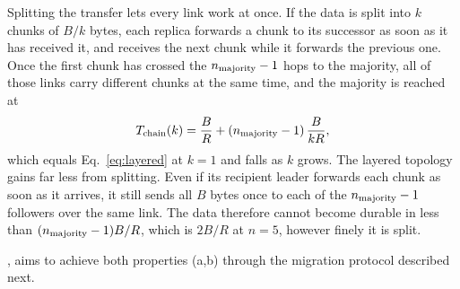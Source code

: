 Splitting the transfer lets every link work at once.
If the data is split into $k$ chunks of $B/k$ bytes, each replica forwards a chunk to its
successor as soon as it has received it, and receives the next chunk while it forwards the
previous one.
Once the first chunk has crossed the $n_{\mathrm{majority}} - 1$ hops to the majority, all of those links carry
different chunks at the same time, and the majority is reached at
\begin{equation}
  T_{\mathrm{chain}}(k) = \frac{B}{R} + (n_{\mathrm{majority}} - 1)\,\frac{B}{kR},
  \label{eq:chain}
\end{equation}
which equals Eq.~\eqref{eq:layered} at $k=1$ and falls as $k$ grows.
The layered topology gains far less from splitting.
Even if its recipient leader forwards each chunk as soon as it arrives, it still sends all
$B$ bytes once to each of the $n_{\mathrm{majority}} - 1$ followers over the same link.
The data therefore cannot become durable in less than $(n_{\mathrm{majority}} - 1)B/R$, which is $2B/R$ at
$n = 5$, however finely it is split.


\OurImplementation{}, aims to achieve both properties (a,b) through the migration protocol described next.

